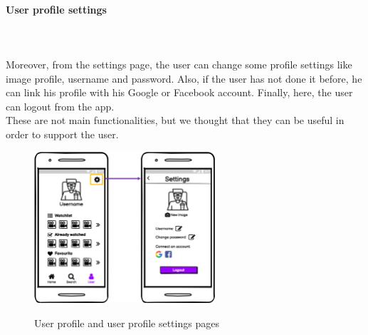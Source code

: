 \documentclass[12pt, a4paper]{article}
\numberwithin{figure}{section}
\begin{document}
\paragraph{User profile settings}
\mbox{}\\\\
Moreover, from the settings page, the user can change some profile settings like image profile, username and
password. Also, if the user has not done it before, he can link his profile with his Google or Facebook account.
Finally, here, the user can logout from the app.\\
These are not main functionalities, but we thought that they can be useful in order to support the user.
\begin{figure}[H]
	\centering
	\includegraphics[width=0.6\textwidth]{images/mockups/userSettings.png}\\
	\caption{User profile and user profile settings pages}
\end{figure}
\end{document}

